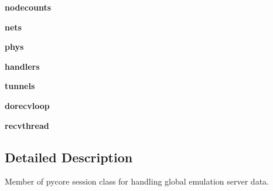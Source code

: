 \begin{DoxyCompactItemize}
\item 
\hypertarget{classcore_1_1broker_1_1_core_broker_a54006ad1eb2aac7a9671e4f7cc6bc7fc}{{\bfseries nodecounts}}\label{classcore_1_1broker_1_1_core_broker_a54006ad1eb2aac7a9671e4f7cc6bc7fc}

\item 
\hypertarget{classcore_1_1broker_1_1_core_broker_aa48b944c323520f1dd9ed4e2558a34c4}{{\bfseries nets}}\label{classcore_1_1broker_1_1_core_broker_aa48b944c323520f1dd9ed4e2558a34c4}

\item 
\hypertarget{classcore_1_1broker_1_1_core_broker_a927ce4debaf14fadf55ab10daed9645d}{{\bfseries phys}}\label{classcore_1_1broker_1_1_core_broker_a927ce4debaf14fadf55ab10daed9645d}

\item 
\hypertarget{classcore_1_1broker_1_1_core_broker_add811170458c1c3b9cf3d6b0ba0fec34}{{\bfseries handlers}}\label{classcore_1_1broker_1_1_core_broker_add811170458c1c3b9cf3d6b0ba0fec34}

\item 
\hypertarget{classcore_1_1broker_1_1_core_broker_acd5f314fd5c4e79dd613207235922b3b}{{\bfseries tunnels}}\label{classcore_1_1broker_1_1_core_broker_acd5f314fd5c4e79dd613207235922b3b}

\item 
\hypertarget{classcore_1_1broker_1_1_core_broker_ae8023f84783cb5f3630249127fae5613}{{\bfseries dorecvloop}}\label{classcore_1_1broker_1_1_core_broker_ae8023f84783cb5f3630249127fae5613}

\item 
\hypertarget{classcore_1_1broker_1_1_core_broker_a6534a4c280fa3222c19281109b05f0c6}{{\bfseries recvthread}}\label{classcore_1_1broker_1_1_core_broker_a6534a4c280fa3222c19281109b05f0c6}

\end{DoxyCompactItemize}


\subsection{Detailed Description}
\begin{DoxyVerb}Member of pycore session class for handling global emulation server
    data.
\end{DoxyVerb}
 

